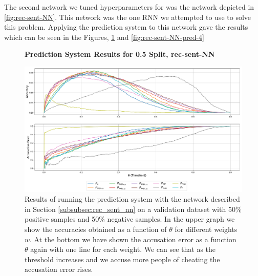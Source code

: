 The second network we tuned hyperparameters for was the network depicted in
\ref{fig:rec-sent-NN}. This network was the one \gls{RNN} we attempted to use
to solve this problem. Applying the prediction system to this network gave the
results which can be seen in the Figures, \ref{fig:rec-sent-NN-pred-50} and
\ref{fig:rec-sent-NN-pred-4}

\begin{figure}
    \centering
    \textbf{Prediction System Results for 0.5 Split, \glsdesc{rec-sent-NN}}\par\medskip
    \includegraphics[scale=0.33]{./pictures/experiments/rec_sent_nn/prediction_system_50}
    \caption{Results of running the prediction system with the network described
        in Section \ref{subsubsec:rec_sent_nn} on a validation dataset
        with 50\% positive samples and 50\% negative samples. In the upper graph
        we show the accuracies obtained as a function of $\theta$ for different
        weights $w$. At the bottom we have shown the accusation error as a
        function $\theta$ again with one line for each weight. We can see that
        as the threshold increases and we accuse more people of cheating the
        accusation error rises.}
    \label{fig:rec-sent-NN-pred-50}
\end{figure}

